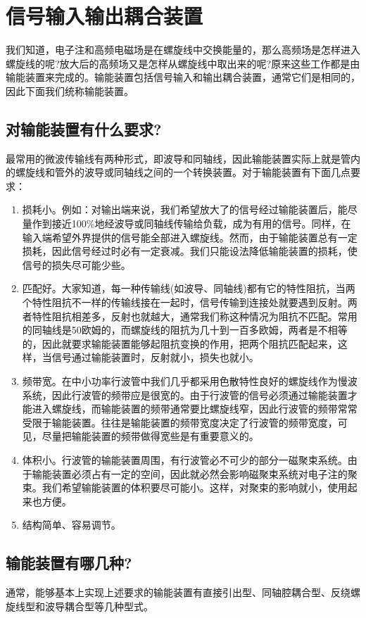 \chapter{信号输入输出耦合装置}
我们知道，电子注和高频电磁场是在螺旋线中交换能量的，那么高频场是怎样进入螺旋线的呢?放大后的高频场又是怎样从螺旋线中取出来的呢?原来这些工作都是由输能装置来完成的。输能装置包括信号输入和输出耦合装置，通常它们是相同的，因此下面我们统称输能装置。

\section{对输能装置有什么要求?}

最常用的微波传输线有两种形式，即波导和同轴线，因此输能装置实际上就是管内的螺旋线和管外的波导或同轴线之间的一个转换装置。对于输能装置有下面几点要求：

\begin{enumerate}
	\item 损耗小。例如：对输出端来说，我们希望放大了的信号经过输能装置后，能尽量作到接近100\%地经波导或同轴线传输给负载，成为有用的信号。同样，在输入端希望外界提供的信号能全部进入螺旋线。然而，由于输能装置总有一定损耗，因此信号经过时必有一定衰减。我们只能设法降低输能装置的损耗，使信号的损失尽可能少些。
	\item 匹配好。大家知道，每一种传输线(如波导、同轴线)都有它的特性阻抗，当两个特性阻抗不一样的传输线接在一起时，信号传输到连接处就要遇到反射。两者特性阻抗相差多，反射也就越大，通常我们称这种情况为阻抗不匹配。常用的同轴线是50欧姆的，而螺旋线的阻抗为几十到一百多欧姆，两者是不相等的，因此就要求输能装置能够起阻抗变换的作用，把两个阻抗匹配起来，这样，当信号通过输能装置时，反射就小，损失也就小。
	\item 频带宽。在中小功率行波管中我们几乎都采用色散特性良好的螺旋线作为慢波系统，因此行波管的频带应是很宽的。由于行波管的信号必须通过输能装置才能进入螺旋线，而输能装置的频带通常要比螺旋线窄，因此行波管的频带常常受限于输能装置。往往是输能装置的频带宽度决定了行波管的频带宽度，可见，尽量把输能装置的频带做得宽些是有重要意义的。
	\item 体积小。行波管的输能装置周围，有行波管必不可少的部分一磁聚束系统。由于输能装置必须占有一定的空间，因此就必然会影响磁聚束系统对电子注的聚束。我们希望输能装置的体积要尽可能小。这样，对聚束的影响就小，使用起来也方便。
	\item 结构简单、容易调节。
\end{enumerate}
\section{输能装置有哪几种?}
通常，能够基本上实现上述要求的输能装置有直接引出型、同轴腔耦合型、反绕螺旋线型和波导耦合型等几种型式。
